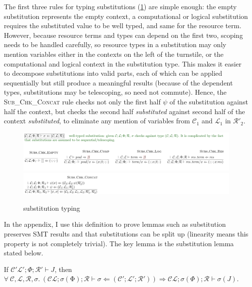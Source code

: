 The first three rules for typing substitutions (\cref{fig:soundness-sub}) are
simple enough: the empty substitution represents the empty context, a
computational or logical substitution requires the substituted value to be well
typed, and same for the resource term. However, because resource terms and
types can depend on the first two, scoping needs to be handled carefully,
so resource types in a substitution may only mention variables
either in the contexts on the left of the turnstile, or the computational
and logical context in the substitution type. This makes it easier to decompose
substitutions into valid parts, each of which can be applied sequentially but
still produce a meaningful results (because of the dependent types,
substitutions may be telescoping, so need not commute). Hence, the
\textsc{Sub\_Chk\_Concat} rule checks not only the first half $\psi$ of the
substitution against half the context, but checks the second half
\emph{substituted} against second half of the context \emph{substituted}, to
eliminate any mention of variables from $\mathcal{C}_1$ and $\mathcal{L}_1$ in
$\mathcal{R}'_2$.

\begin{figure}[tp]
    \includegraphics{figures/kernel-soundness-sub-1}
    \includegraphics{figures/kernel-soundness-sub-2}
    \caption{ substitution typing}\label{fig:soundness-sub}
\end{figure}

In the appendix, I use this definition to prove lemmas such as substitution
preserves SMT results and that substitutions can be split up (linearity means
this property is not completely trivial). The key lemma is the substitution
lemma stated below.

\begin{lemma}
If $\mathcal{C}'    \mathcal{L}'  ;  \Phi  ;  \mathcal{R}'  \vdash  J$,
then $ \forall \ \mathcal{C}, \mathcal{L}, \mathcal{R}, \sigma.\
\left( \mathcal{C}    \mathcal{L}  ;  \sigma  (  \mathrm{ \Phi }  )  ;
\mathcal{R}  \vdash  \sigma  \Leftarrow  (  \mathcal{C}'  ;  \mathcal{L}'  ;
\mathcal{R}'  ) \right)  \Rightarrow \allowbreak
\mathcal{C}    \mathcal{L}  ;  \sigma  (  \Phi  )  ;  \mathcal{R}  \vdash  \sigma ( J ) $.
\end{lemma}

